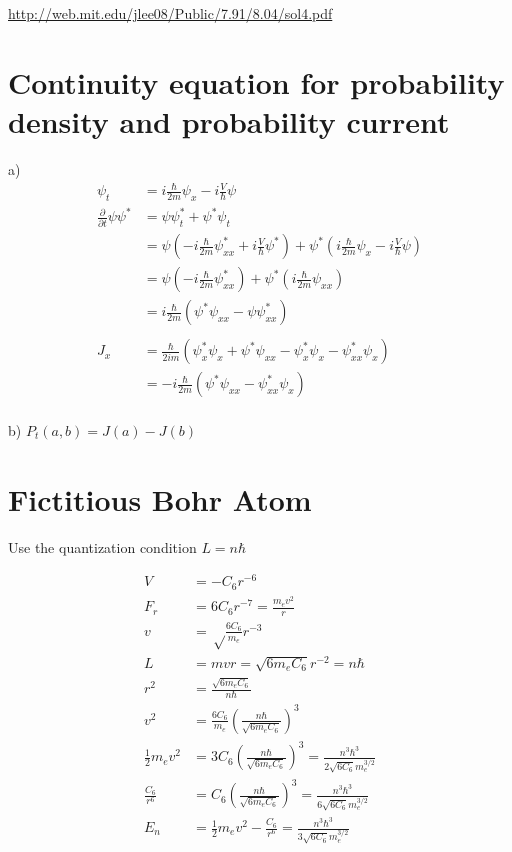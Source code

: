 \documentclass{article}
\title{}
\date{}
\newcommand{\half}{\frac{1}{2}}
\newcommand{\<}{\langle}
\renewcommand{\>}{\rangle}
\begin{document}
\maketitle

\url{http://web.mit.edu/jlee08/Public/7.91/8.04/sol4.pdf}

\section{Continuity equation for probability density and probability current}
a)
\begin{align*}
\psi_t &= i\frac{\hbar}{2m} \psi_x -i\frac{V}{\hbar} \psi \\
\frac{\partial}{\partial t} \psi\psi^* &= \psi\psi^*_t + \psi^*\psi_t \\
&= \psi(-i\frac{\hbar}{2m} \psi^*_{xx} + i\frac{V}{\hbar} \psi^* ) + \psi^*(i\frac{\hbar}{2m} \psi_x -i\frac{V}{\hbar} \psi) \\
&= \psi(-i\frac{\hbar}{2m} \psi^*_{xx}) + \psi^*(i\frac{\hbar}{2m} \psi_{xx}) \\ 
&= i\frac{\hbar}{2m} (\psi^*\psi_{xx} - \psi\psi^*_{xx}) \\
\\
J_x &= \frac{\hbar}{2im}(\psi^*_x\psi_x + \psi^*\psi_{xx} - \psi^*_x\psi_x - \psi^*_{xx}\psi_x) \\
&= -i\frac{\hbar}{2m}(\psi^*\psi_{xx} - \psi^*_{xx}\psi_x) 
\end{align*}
\\
b) $P_t(a,b) = J(a) - J(b)$

\section{Fictitious Bohr Atom}

Use the quantization condition $L = n\hbar$

\begin{align*}
V &= -C_6r^{-6} \\
F_r &= 6C_6r^{-7} = \frac{m_e v^2}{r} \\
v &= \sqrt\frac{6C_6}{m_e}r^{-3} \\
L &= mvr = \sqrt{6m_eC_6}r^{-2} = n\hbar \\
r^2 &= \frac{\sqrt{6m_eC_6}}{n\hbar} \\
v^2 &= \frac{6C_6}{m_e} (\frac{n\hbar}{\sqrt{6m_eC_6}})^3 \\
\half m_e v^2 &= 3C_6 (\frac{n\hbar}{\sqrt{6m_eC_6}})^3 = \frac{n^3\hbar^3}{2\sqrt{6C_6}m_e^{3/2}} \\
\frac{C_6}{r^6} &= C_6 (\frac{n\hbar}{\sqrt{6m_eC_6}})^3 = \frac{n^3\hbar^3}{6\sqrt{6C_6}m_e^{3/2}} \\
E_n &= \half m_e v^2 - \frac{C_6}{r^6} = \frac{n^3\hbar^3}{3\sqrt{6C_6}m_e^{3/2}}
\end{align*}
\end{document}
